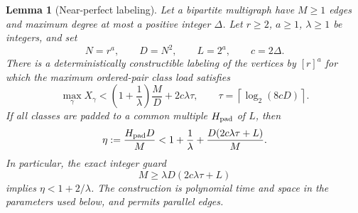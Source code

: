 \documentclass[11pt]{article}
\newtheorem{lemma}[theorem]{Lemma}
\theoremstyle{remark}\newtheorem{remark}[theorem]{Remark}
\newcommand{\ceil}[1]{\left\lceil #1\right\rceil}
\newcommand{\Hpad}{H_{\rm pad}}
\begin{document}
\begin{lemma}[Near-perfect labeling]\label{lem:matching}
Let a bipartite multigraph have \(M\ge1\) edges and maximum degree at most a positive integer \(\Delta\). Let \(r\ge2\), \(a\ge1\), \(\lambda\ge1\) be integers, and set
\[
 N=r^a,\qquad D=N^2,\qquad L=2^a,\qquad c=2\Delta.
\]
There is a deterministically constructible labeling of the vertices by \([r]^a\) for which the maximum ordered-pair class load satisfies
\begin{equation}
 \max_\gamma X_\gamma<
 \left(1+\frac1\lambda\right)\frac MD+2c\lambda\tau,
 \qquad \tau=\ceil{\log_2(8cD)}.\label{eq:load}
\end{equation}
If all classes are padded to a common multiple \(\Hpad\) of \(L\), then
\begin{equation}
 \eta:=\frac{\Hpad D}{M}
 <1+\frac1\lambda+\frac{D(2c\lambda\tau+L)}M.\label{eq:eta}
\end{equation}
In particular, the exact integer guard
\begin{equation}
 M\ge\lambda D(2c\lambda\tau+L)\label{eq:packingguard}
\end{equation}
implies \(\eta<1+2/\lambda\). The construction is polynomial time and space in the parameters used below, and permits parallel edges.
\end{lemma}
\end{document}
